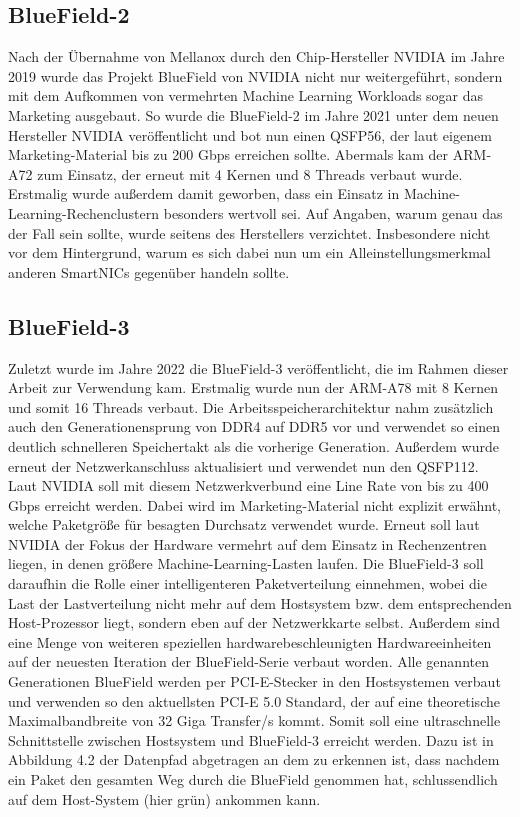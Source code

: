 \subsection{BlueField-2}
Nach der Übernahme von Mellanox durch den Chip-Hersteller NVIDIA im Jahre 2019 wurde das Projekt BlueField von NVIDIA nicht nur weitergeführt, sondern mit dem Aufkommen von vermehrten Machine Learning Workloads sogar das Marketing ausgebaut. So wurde die BlueField-2 im Jahre 2021 unter dem neuen Hersteller NVIDIA veröffentlicht und bot nun einen QSFP56, der laut eigenem Marketing-Material bis zu 200 Gbps erreichen sollte. Abermals kam der ARM-A72 zum Einsatz, der erneut mit 4 Kernen und 8 Threads verbaut wurde. \cite{bluefieldhistory} Erstmalig wurde außerdem damit geworben, dass ein Einsatz in Machine-Learning-Rechenclustern besonders wertvoll sei. Auf Angaben, warum genau das der Fall sein sollte, wurde seitens des Herstellers verzichtet. Insbesondere nicht vor dem Hintergrund, warum es sich dabei nun um ein Alleinstellungsmerkmal anderen SmartNICs gegenüber handeln sollte.
\subsection{BlueField-3}
Zuletzt wurde im Jahre 2022 die BlueField-3 veröffentlicht, die im Rahmen dieser Arbeit zur Verwendung kam. Erstmalig wurde nun der ARM-A78 mit 8 Kernen und somit 16 Threads verbaut. Die Arbeitsspeicherarchitektur nahm zusätzlich auch den Generationensprung von DDR4 auf DDR5 vor und verwendet so einen deutlich schnelleren Speichertakt als die vorherige Generation. Außerdem wurde erneut der Netzwerkanschluss aktualisiert und verwendet nun den QSFP112. Laut NVIDIA soll mit diesem Netzwerkverbund eine Line Rate von bis zu 400 Gbps erreicht werden. \cite{battle} Dabei wird im Marketing-Material nicht explizit erwähnt, welche Paketgröße für besagten Durchsatz verwendet wurde. Erneut soll laut NVIDIA der Fokus der Hardware vermehrt auf dem Einsatz in Rechenzentren liegen, in denen größere Machine-Learning-Lasten laufen. Die BlueField-3 soll daraufhin die Rolle einer intelligenteren Paketverteilung einnehmen, wobei die Last der Lastverteilung nicht mehr auf dem Hostsystem bzw. dem entsprechenden Host-Prozessor liegt, sondern eben auf der Netzwerkkarte selbst. Außerdem sind eine Menge von weiteren speziellen hardwarebeschleunigten Hardwareeinheiten auf der neuesten Iteration der BlueField-Serie verbaut worden. Alle genannten Generationen BlueField werden per PCI-E-Stecker in den Hostsystemen verbaut und verwenden so den aktuellsten PCI-E 5.0 Standard, der auf eine theoretische Maximalbandbreite von 32 Giga Transfer/s kommt. Somit soll eine ultraschnelle Schnittstelle zwischen Hostsystem und BlueField-3 erreicht werden. Dazu ist in Abbildung 4.2 der Datenpfad abgetragen an dem zu erkennen ist, dass nachdem ein Paket den gesamten Weg durch die BlueField genommen hat, schlussendlich auf dem Host-System (hier grün) ankommen kann.
